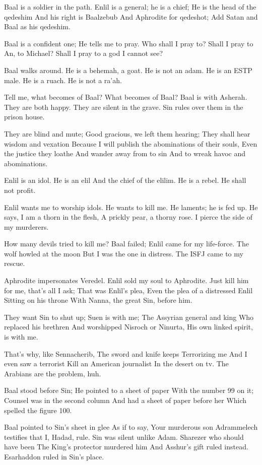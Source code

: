 \documentclass[
]{book}
\begin{document}
Baal is a soldier in the path.
Enlil is a general; he is a chief;
He is the head of the qedeshim
And his right is Baalzebub
And Aphrodite for qedeshot;
Add Satan and Baal as his qedeshim.

Baal is a confident one;
He tells me to pray.
Who shall I pray to?
Shall I pray to An, to Michael?
Shall I pray to a god I cannot see?

Baal walks around.
He is a behemah, a goat.
He is not an adam.
He is an ESTP male.
He is a ruach.
He is not a ra'ah.

Tell me, what becomes of Baal?
What becomes of Baal?
Baal is with Asherah.
They are both happy.
They are silent in the grave.
Sin rules over them in the prison house.

They are blind and mute;
Good gracious, we left them hearing;
They shall hear wisdom and vexation
Because I will publish the abominations of their souls,
Even the justice they loathe
And wander away from to sin
And to wreak havoc and abominations.

Enlil is an idol.
He is an elil
And the chief of the elilim.
He is a rebel.
He shall not profit.

Enlil wants me to worship idols.
He wants to kill me.
He laments; he is fed up.
He says, I am a thorn in the flesh,
A prickly pear, a thorny rose.
I pierce the side of my murderers.

How many devils tried to kill me?
Baal failed; Enlil came for my life-force.
The wolf howled at the moon
But I was the one in distress.
The ISFJ came to my rescue.

Aphrodite impersonates Veredel.
Enlil sold my soul to Aphrodite.
Just kill him for me, that's all I ask;
That was Enlil's plea,
Even the plea of a distressed Enlil
Sitting on his throne
With Nanna, the great Sin, before him.

They want Sin to shut up;
Suen is with me;
The Assyrian general and king
Who replaced his brethren
And worshipped Nisroch or Ninurta,
His own linked spirit, is with me.

That's why, like Sennacherib,
The sword and knife keeps
Terrorizing me
And I even saw a terrorist
Kill an American journalist
In the desert on tv.
The Arabians are the problem, huh.

Baal stood before Sin;
He pointed to a sheet of paper
With the number 99 on it;
Counsel was in the second column
And had a sheet of paper before her
Which spelled the figure 100.

Baal pointed to Sin's sheet in glee
As if to say, Your murderous son
Adrammelech testifies that I, Hadad, rule.
Sin was silent unlike Adam.
Sharezer who should have been
The King's protector murdered him
And Asshur's gift ruled instead.
Esarhaddon ruled in Sin's place.
\end{document}
